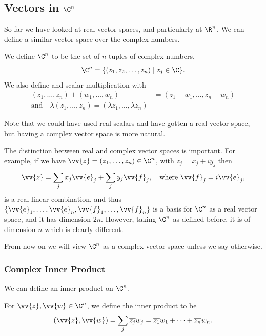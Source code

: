 \subsection{Vectors in $\C^n$}

So far we have looked at real vector spaces, and particularly at $\R^n$. We can define a similar vector space over the complex numbers.

\begin{definition}[$\C^n$ Space]
    We define $\C^n$ to be the set of $n$-tuples of complex numbers,
    $$
    \C^n = \{(z_1, z_2, \dots, z_n) \mid z_j \in \C\}.
    $$
    We also define  and scalar multiplication with
    \begin{align*}
        \left(z_{1}, \ldots, z_{n}\right)+\left(w_{1}, \ldots, w_{n}\right)&=\left(z_{1}+w_{1}, \ldots, z_{n}+w_{n}\right) \\
        \text{and} \quad \lambda\left(z_{1}, \ldots, z_{n}\right)=\left(\lambda z_{1}, \ldots, \lambda z_{n}\right) 
    \end{align*}
\end{definition}

Note that we could have used real scalars and have gotten a real vector space, but having a complex vector space is more natural. 

The distinction between real and complex vector spaces is important. For example, if we have $\vv{z} = (z_1, \dots, z_n) \in \C^n$, with $z_j = x_j + i y_j$ then
$$
\vv{z} = \sum_j x_j \vv{e}_j + \sum_j y_j \vv{f}_j, \quad \text{where } \vv{f}_j = i \vv{e}_j,
$$
is a real linear combination, and thus $\{\vv{e}_1, \dots, \vv{e}_n, \vv{f}_1, \dots, \vv{f}_n\}$ is a basis for $\C^n$ as a real vector space, and it has dimension $2n$. However, taking $\C^n$ as defined before, it is of dimension $n$ which is clearly different.

From now on we will view $\C^n$ as a complex vector space unless we say otherwise.

\subsubsection{Complex Inner Product}

We can define an inner product on $\C^n$.

\begin{definition}
    For $\vv{z}, \vv{w} \in \C^n$, we define the inner product to be
    $$
    (\vv{z}, \vv{w}) = \sum_j \overline{z_j} w_j = \overline{z_1} w_1 + \cdots + \overline{z_n} w_n.
    $$
\end{definition}

